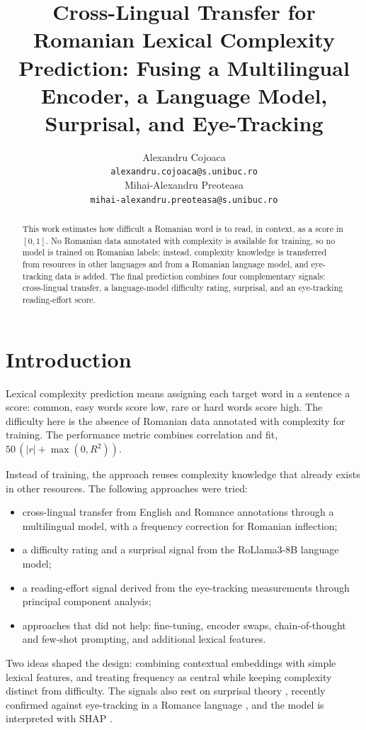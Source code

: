 \documentclass[11pt]{article}
\title{Cross-Lingual Transfer for Romanian Lexical Complexity Prediction:
Fusing a Multilingual Encoder, a Language Model, Surprisal, and Eye-Tracking}
\author{
  Alexandru Cojoaca \\
  {\small\texttt{alexandru.cojoaca@s.unibuc.ro}} \\\And
  Mihai-Alexandru Preoteasa \\
  {\small\texttt{mihai-alexandru.preoteasa@s.unibuc.ro}} }
\begin{document}
\maketitle

\begin{abstract}
This work estimates how difficult a Romanian word is to read, in context, as a score in $[0,1]$. No Romanian data
annotated with complexity is available for training, so no model is trained on Romanian labels; instead, complexity
knowledge is transferred from resources in other languages and from a Romanian language model, and eye-tracking
data is added. The final prediction combines four complementary signals: cross-lingual transfer, a language-model
difficulty rating, surprisal, and an eye-tracking reading-effort score.
\end{abstract}

\section{Introduction}
\label{section:intro}
Lexical complexity prediction means assigning each target word in a sentence a score: common, easy words score low,
rare or hard words score high. The difficulty here is the absence of Romanian data annotated with complexity for
training. The performance metric combines correlation and fit, $50\,(|r| + \max(0,R^2))$.

Instead of training, the approach reuses complexity knowledge that already exists in other resources. The following
approaches were tried:
\begin{itemize}
  \item cross-lingual transfer from English and Romance annotations through a multilingual model, with a frequency
        correction for Romanian inflection;
  \item a difficulty rating and a surprisal signal from the RoLlama3-8B language model;
  \item a reading-effort signal derived from the eye-tracking measurements through principal component analysis;
  \item approaches that did not help: fine-tuning, encoder swaps, chain-of-thought and few-shot prompting, and
        additional lexical features.
\end{itemize}

Two ideas shaped the design: combining contextual embeddings with simple lexical features, and treating frequency
as central while keeping complexity distinct from difficulty. The signals also rest on surprisal theory
\citep{hale2001probabilistic}, recently confirmed against eye-tracking in a Romance language
\citep{gaze4nlp2025surprisal}, and the model is interpreted with SHAP \citep{lundberg2017shap}.
\end{document}
